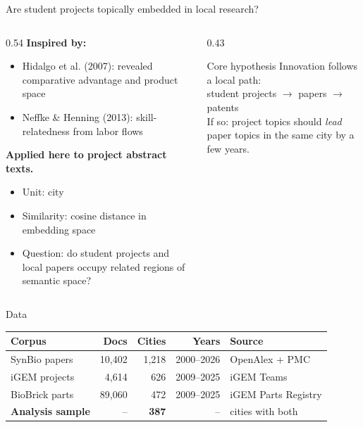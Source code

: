 \documentclass[10pt,aspectratio=169]{beamer}
\begin{document}
\begin{frame}{Are student projects topically embedded in local research?}
\begin{columns}[T]
\begin{column}{0.54\textwidth}
  \textbf{Inspired by:}
  \begin{itemize}
    \item Hidalgo et al. (2007): revealed comparative advantage and product space
    \item Neffke \& Henning (2013): skill-relatedness from labor flows
  \end{itemize}
  \vspace{0.5em}
  \textbf{Applied here to project abstract texts.}
  \vspace{0.5em}
  \begin{itemize}
    \item Unit: city
    \item Similarity: cosine distance in embedding space
    \item Question: do student projects and local papers occupy related regions of semantic space?
  \end{itemize}
\end{column}
\begin{column}{0.43\textwidth}
  \vspace{0.3em}
  \begin{block}{Core hypothesis}
    Innovation follows a local path:\\
    student projects $\to$ papers $\to$ patents\\[0.3em]
    If so: project topics should \emph{lead} paper topics in the same city by a few years.
  \end{block}
\end{column}
\end{columns}
\end{frame}



\begin{frame}{Data}
\centering
\begin{tabular}{lrrrl}
\toprule
Corpus & Docs & Cities & Years & Source \\
\midrule
SynBio papers & 10{,}402 & 1{,}218 & 2000--2026 & OpenAlex + PMC\\
iGEM projects & 4{,}614 & 626 & 2009--2025 & iGEM Teams \\
BioBrick parts & 89{,}060 & 472 & 2009--2025 & iGEM Parts Registry \\
\midrule
\textbf{Analysis sample} & -- & \textbf{387} & -- & cities with both \\
\bottomrule
\end{tabular}

\vspace{0.6em}

\end{frame}
\end{document}
